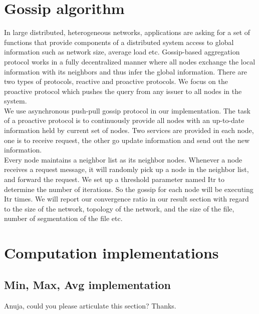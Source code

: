 \documentclass[12pt, conference, compsocconf]{IEEEtran}
\begin{document}
\section{Gossip algorithm  }
\indent In large distributed, heterogeneous networks, applications are asking for a set of functions that provide components of a distributed system access to global information such as network size, average load etc. Gossip-based aggregation protocol works in a fully decentralized manner where all nodes exchange the local information with its neighbors and thus infer the global information. There are two types of protocols, reactive and proactive protocols. We focus on the proactive protocol which pushes the query from any issuer to all nodes in the system.   \\
\indent We use asynchronous push-pull gossip protocol in our implementation. The task of a proactive protocol is to continuously provide all nodes with an up-to-date information held by current set of nodes. Two services are provided in each node, one is to receive request, the other go update information and send out the new information.  \\
\indent Every node maintains a neighbor list as its neighbor nodes. Whenever a node receives a request message, it will randomly pick up a node in the neighbor list, and forward the request. We set up a threshold parameter named Itr to determine the number of iterations. So the gossip for each node will be executing Itr times. We will report our convergence ratio in our result section with regard to the size of the network, topology of the network, and the size of the file, number of segmentation of the file etc. 

\section{Computation implementations}
 \subsection{Min, Max, Avg implementation}
Anuja, could you please articulate this section? Thanks.
\end{document}

